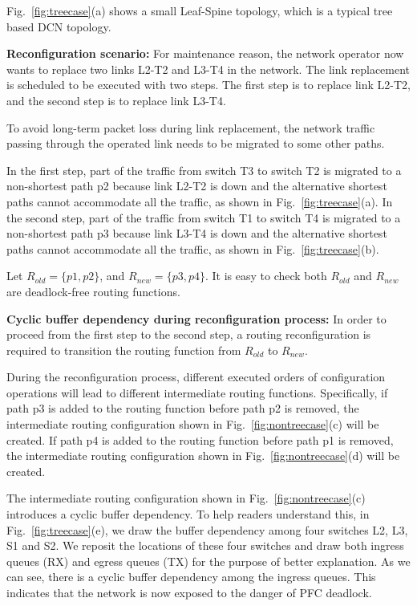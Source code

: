 Fig.~\ref{fig:treecase}(a) shows a small Leaf-Spine topology, which is a typical tree based DCN topology.

\textbf{Reconfiguration scenario:} For maintenance reason, the network operator now wants to replace two links L2-T2 and L3-T4 in the network. The link replacement is scheduled to be executed with two steps. The first step is to replace link L2-T2, and the second step is to replace link L3-T4.

To avoid long-term packet loss during link replacement, the network traffic passing through the operated link needs to be migrated to some other paths. 

In the first step, part of the traffic from switch T3 to switch T2 is migrated to a non-shortest path p2 because link L2-T2 is down and the alternative shortest paths cannot accommodate all the traffic, as shown in Fig.~\ref{fig:treecase}(a). In the second step, part of the traffic from switch T1 to switch T4 is migrated to a non-shortest path p3 because link L3-T4 is down and the alternative shortest paths cannot accommodate all the traffic, as shown in Fig.~\ref{fig:treecase}(b).

Let $R_{old} = \{p1, p2\}$, and $R_{new} = \{p3, p4\}$. It is easy to check both $R_{old}$ and $R_{new}$ are deadlock-free routing functions. 

\textbf{Cyclic buffer dependency during reconfiguration process:} In order to proceed from the first step to the second step, a routing reconfiguration is required to transition the routing function from $R_{old}$ to $R_{new}$.

During the reconfiguration process, different executed orders of configuration operations will lead to different intermediate routing functions. Specifically, if path p3 is added to the routing function before path p2 is removed, the intermediate routing configuration shown in Fig.~\ref{fig:nontreecase}(c) will be created. If path p4 is added to the routing function before path p1 is removed, the intermediate routing configuration shown in Fig.~\ref{fig:nontreecase}(d) will be created.  

The intermediate routing configuration shown in Fig.~\ref{fig:nontreecase}(c) introduces a cyclic buffer dependency.  To help readers understand this, in Fig.~\ref{fig:treecase}(e), we draw the buffer dependency among four switches L2, L3, S1 and S2. We reposit the locations of these four switches and draw both ingress queues (RX) and egress queues (TX) for the purpose of better explanation. As we can see, there is a cyclic buffer dependency among the ingress queues. This indicates that the network is now exposed to the danger of PFC deadlock.


